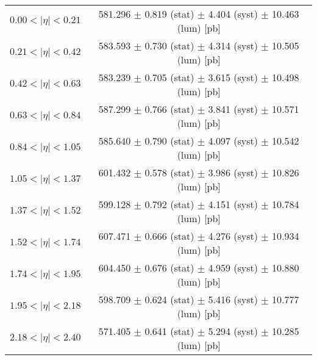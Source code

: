 \begin{tabular}{lc}
\hline
$0.00 < |\eta| <0.21$          & 581.296 $\pm$ 0.819 (stat) $\pm$ 4.404 (syst) $\pm$ 10.463 (lum) [pb]  \\
$0.21 < |\eta| <0.42$          & 583.593 $\pm$ 0.730 (stat) $\pm$ 4.314 (syst) $\pm$ 10.505 (lum) [pb]  \\
$0.42 < |\eta| <0.63$          & 583.239 $\pm$ 0.705 (stat) $\pm$ 3.615 (syst) $\pm$ 10.498 (lum) [pb]  \\
$0.63 < |\eta| <0.84$          & 587.299 $\pm$ 0.766 (stat) $\pm$ 3.841 (syst) $\pm$ 10.571 (lum) [pb]  \\
$0.84 < |\eta| <1.05$          & 585.640 $\pm$ 0.790 (stat) $\pm$ 4.097 (syst) $\pm$ 10.542 (lum) [pb]  \\
$1.05 < |\eta| <1.37$          & 601.432 $\pm$ 0.578 (stat) $\pm$ 3.986 (syst) $\pm$ 10.826 (lum) [pb]  \\
$1.37 < |\eta| <1.52$          & 599.128 $\pm$ 0.792 (stat) $\pm$ 4.151 (syst) $\pm$ 10.784 (lum) [pb]  \\
$1.52 < |\eta| <1.74$          & 607.471 $\pm$ 0.666 (stat) $\pm$ 4.276 (syst) $\pm$ 10.934 (lum) [pb]  \\
$1.74 < |\eta| <1.95$          & 604.450 $\pm$ 0.676 (stat) $\pm$ 4.959 (syst) $\pm$ 10.880 (lum) [pb]  \\
$1.95 < |\eta| <2.18$          & 598.709 $\pm$ 0.624 (stat) $\pm$ 5.416 (syst) $\pm$ 10.777 (lum) [pb]  \\
$2.18 < |\eta| <2.40$          & 571.405 $\pm$ 0.641 (stat) $\pm$ 5.294 (syst) $\pm$ 10.285 (lum) [pb]  \\
\hline
\end{tabular}
